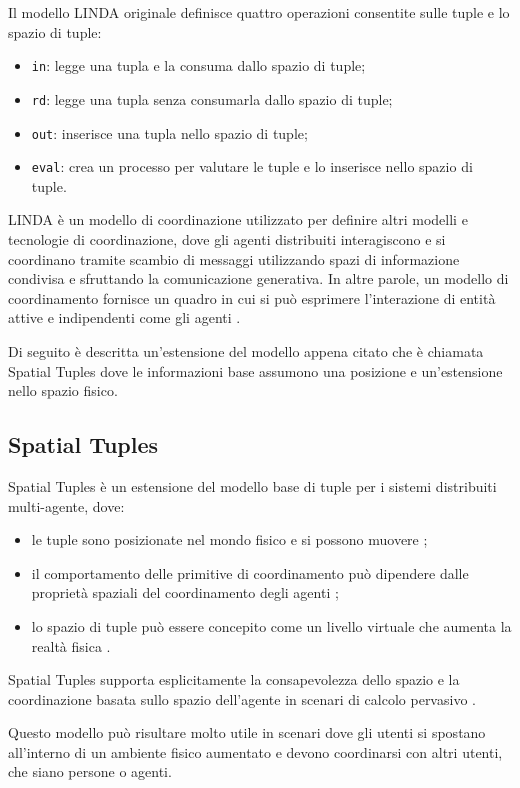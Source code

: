 Il modello LINDA originale definisce quattro operazioni consentite sulle tuple e lo spazio di tuple:
\begin{itemize}
\item \texttt{in}: legge una tupla e la consuma dallo spazio di tuple;
\item \texttt{rd}: legge una tupla senza consumarla dallo spazio di tuple;
\item \texttt{out}: inserisce una tupla nello spazio di tuple;
\item \texttt{eval}: crea un processo per valutare le tuple e lo inserisce nello spazio di tuple.
\end{itemize}

LINDA è un modello di coordinazione utilizzato per definire altri modelli e tecnologie di coordinazione, dove gli agenti distribuiti interagiscono e si coordinano tramite scambio di messaggi utilizzando spazi di informazione condivisa e sfruttando la comunicazione generativa.
In altre parole, un modello di coordinamento fornisce un quadro in cui si può esprimere l'interazione di entità attive e indipendenti come gli agenti \cite{coord-model-ciancarini}.

Di seguito è descritta un'estensione del modello appena citato che è chiamata Spatial Tuples dove le informazioni base assumono una posizione e un'estensione nello spazio fisico.

\subsection{Spatial Tuples}
Spatial Tuples è un estensione del modello base di tuple per i sistemi distribuiti multi-agente, dove:
\begin{itemize}
\item le tuple sono posizionate nel mondo fisico e si possono muovere \cite{SpatialTuples};
\item il comportamento delle primitive di coordinamento può dipendere dalle proprietà spaziali del coordinamento degli agenti \cite{SpatialTuples};
\item lo spazio di tuple può essere concepito come un livello virtuale che aumenta la realtà fisica \cite{SpatialTuples}.
\end{itemize}
Spatial Tuples supporta esplicitamente la consapevolezza dello spazio e la coordinazione basata sullo spazio dell'agente in scenari di calcolo pervasivo \cite{SpatialTuples}.

Questo modello può risultare molto utile in scenari dove gli utenti si spostano all'interno di un ambiente fisico aumentato e devono coordinarsi con altri utenti, che siano persone o agenti.

